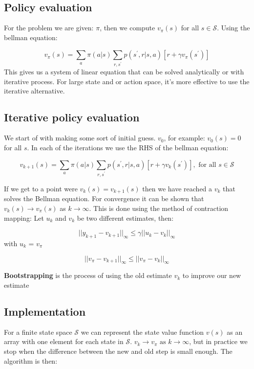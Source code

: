 \subsection{Policy evaluation}
For the problem we are given: $\pi$, then we compute $v_\pi(s)$ for all $s \in \mathcal{S}$. Using the bellman equation: 

	\begin{equation}
		v_\pi(s) = \sum_{a}^{} \pi (a|s) \sum_{r,s^{\prime}}^{} p(s^{\prime},r|s,a)[r + \gamma v_\pi(s^{\prime})] 
	\end{equation}
This gives us a system of linear equation that can be solved analytically or with iterative process. For large state and or action space, it's more effective to use the iterative alternative. 

\subsection{Iterative policy evaluation}
We start of with making some sort of initial guess. $v_0$, for example: $v_0(s) = 0$ for all $s$. In each of the iterations we use the RHS of the bellman equation: 

	\begin{equation}
		v_{k+1}(s) = \sum_{a}^{} \pi (a|s) \sum_{r,s^{\prime}}^{} p(s^{\prime},r|s,a)[r + \gamma v_k(s^{\prime})], \text{ for all } s \in \mathcal{S}
	\end{equation}

If we get to a point were $v_k(s) = v_{k+1}(s)$ then we have reached a $v_k$ that solves the Bellman equation. For convergence it can be shown that $v_k(s)\rightarrow v_\pi(s)  $ as $k \rightarrow \infty$.  This is done using the method of contraction mapping: Let $u_k$ and $v_k$ be two different estimates, then:

	\begin{equation}
		||y_{k+1} - v_{k+1}||_\infty \le \gamma ||u_k - v_k||_\infty
	\end{equation}
with $u_k$ = $v_\pi$

	\begin{equation}
		||v_\pi - v_{k+1}||_\infty \le ||v_\pi - v_k||_\infty
	\end{equation}

\textbf{Bootstrapping} is the process of using the old estimate $v_k$ to improve our new estimate 


\subsection{Implementation}
For a finite state space $\mathcal{S}$ we can represent the state value function $v(s)$ as an array with one element for each state in $\mathcal{S}$. $v_k \rightarrow v_\pi \text{ as } k \rightarrow \infty$,  but in practice we stop when the difference between the new and old step is small enough. The algorithm is then: 

